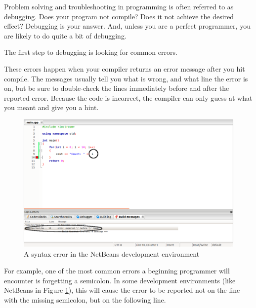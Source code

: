 
Problem solving and troubleshooting in programming is often referred to as debugging. 
Does your program not compile? 
Does it not achieve the desired effect? 
Debugging is your answer. 
And, unless you are a perfect programmer, you are likely to do quite a bit of debugging.

The first step to debugging is looking for common errors.


These errors happen when your compiler returns an error message after you hit compile. 
The messages usually tell you what is wrong, and what line the error is on, but be sure to double-check the lines immediately before and after the reported error. 
Because the code is incorrect, the compiler can only guess at what you meant and give you a hint.

\begin{figure}[tbh]
  \centering
  \includegraphics[width=\textwidth]{diagrams/fig-netbeans-syntax-error.pdf}
  \caption{A syntax error in the NetBeans development environment} \label{fig-netbeans-syntax-error} 
\end{figure}

For example, one of the most common errors a beginning programmer will encounter is forgetting a semicolon. 
In some development environments (like NetBeans in Figure \ref{fig-netbeans-syntax-error}), this will cause the error to be reported not on the line with the missing semicolon, but on the following line. 

